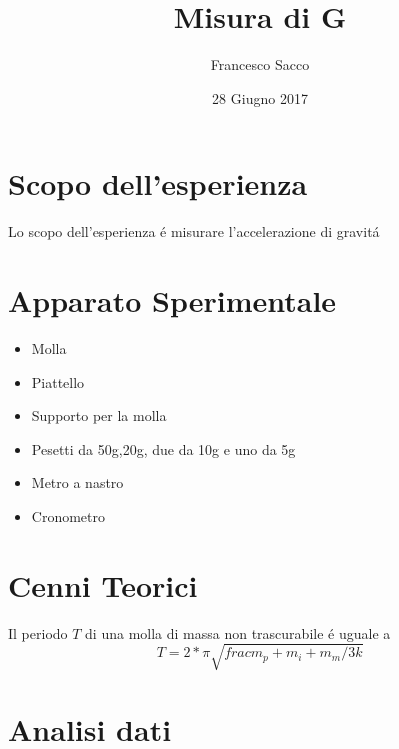 \documentclass{exam}
\date{28 Giugno 2017}
\title{Misura di G}
\author{Francesco Sacco}
\begin{document}
	\maketitle
	\section{Scopo dell'esperienza}
		Lo scopo dell'esperienza \'e misurare l'accelerazione di gravit\'a

	\section{Apparato Sperimentale}
		\begin{itemize}
			\item Molla
			\item Piattello
			\item Supporto per la molla
			\item Pesetti da 50g,20g, due da 10g e uno da 5g
			\item Metro a nastro
			\item Cronometro
		\end{itemize}
	\section{Cenni Teorici}
		Il periodo $T$ di una molla di massa non trascurabile \'e uguale a 
		\begin{equation}
			T=2*\pi \sqrt{frac{m_p+m_i+m_m/3}{k}} 
		\end{equation}
	\section{Analisi dati}
\end{document}
